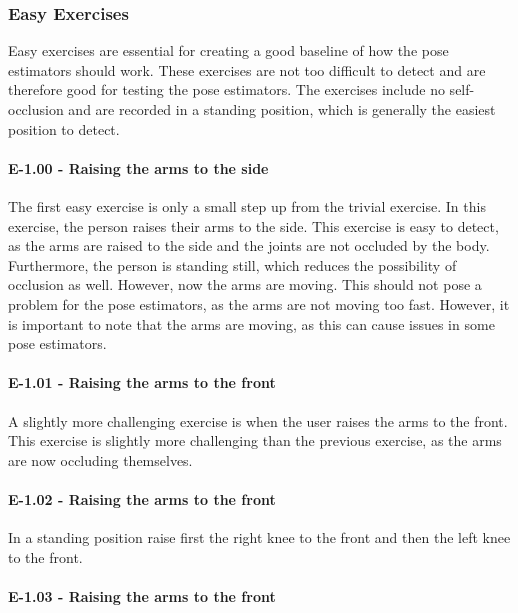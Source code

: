 \subsubsection{Easy Exercises}

Easy exercises are essential for creating a good baseline of how the pose estimators should work. These exercises are not too difficult to detect and are therefore good for testing the pose estimators. The exercises include no self-occlusion and are recorded in a standing position, which is generally the easiest position to detect.

\paragraph{E-1.00 - Raising the arms to the side}

The first easy exercise is only a small step up from the trivial exercise. In this exercise, the person raises their arms to the side. This exercise is easy to detect, as the arms are raised to the side and the joints are not occluded by the body. Furthermore, the person is standing still, which reduces the possibility of occlusion as well. However, now the arms are moving. This should not pose a problem for the pose estimators, as the arms are not moving too fast. However, it is important to note that the arms are moving, as this can cause issues in some pose estimators.

\paragraph{E-1.01 - Raising the arms to the front}

A slightly more challenging exercise is when the user raises the arms to the front. This exercise is slightly more challenging than the previous exercise, as the arms are now occluding themselves.

\paragraph{E-1.02 - Raising the arms to the front}

In a standing position raise first the right knee to the front and then the left knee to the front.  

\paragraph{E-1.03 - Raising the arms to the front}

